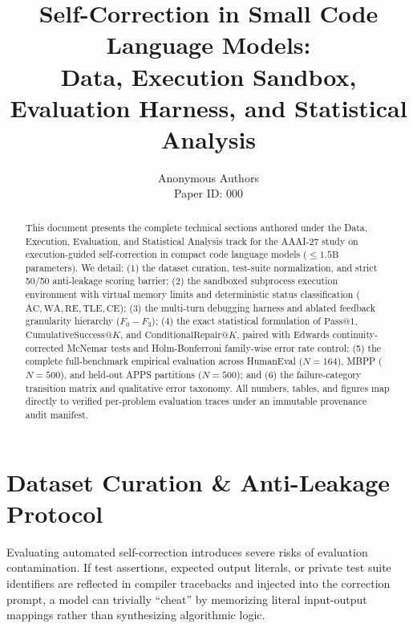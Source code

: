 \documentclass[letterpaper]{article} %
\title{Self-Correction in Small Code Language Models: \\ Data, Execution Sandbox, Evaluation Harness, and Statistical Analysis}
\author{
    Anonymous Authors\\
    Paper ID: 000
}
\begin{document}
\maketitle

\begin{abstract}
This document presents the complete technical sections authored under the Data, Execution, Evaluation, and Statistical Analysis track for the AAAI-27 study on execution-guided self-correction in compact code language models ($\le 1.5\text{B}$ parameters). We detail: (1) the dataset curation, test-suite normalization, and strict 50/50 anti-leakage scoring barrier; (2) the sandboxed subprocess execution environment with virtual memory limits and deterministic status classification ($\text{AC}, \text{WA}, \text{RE}, \text{TLE}, \text{CE}$); (3) the multi-turn debugging harness and ablated feedback granularity hierarchy ($F_0 - F_3$); (4) the exact statistical formulation of $\text{Pass@1}$, $\text{CumulativeSuccess}@K$, and $\text{ConditionalRepair}@K$, paired with Edwards continuity-corrected McNemar tests and Holm-Bonferroni family-wise error rate control; (5) the complete full-benchmark empirical evaluation across HumanEval ($N=164$), MBPP ($N=500$), and held-out APPS partitions ($N=500$); and (6) the failure-category transition matrix and qualitative error taxonomy. All numbers, tables, and figures map directly to verified per-problem evaluation traces under an immutable provenance audit manifest.
\end{abstract}

\section{Dataset Curation \& Anti-Leakage Protocol}
\label{sec:data_curation}

Evaluating automated self-correction introduces severe risks of evaluation contamination. If test assertions, expected output literals, or private test suite identifiers are reflected in compiler tracebacks and injected into the correction prompt, a model can trivially ``cheat'' by memorizing literal input-output mappings rather than synthesizing algorithmic logic.
\end{document}
